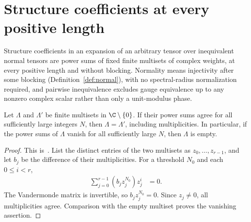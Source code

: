 \section{Structure coefficients at every positive length}
\label{sec:asym_unblocked_coefficients}

Structure coefficients in an expansion of an arbitrary tensor over
inequivalent normal tensors are power sums of fixed finite multisets of
complex weights, at every positive length and without blocking. Normality
means injectivity after some blocking (Definition~\ref{def:normal}), with no
spectral-radius normalization required, and pairwise inequivalence excludes
gauge equivalence up to any nonzero complex scalar rather than only a
unit-modulus phase.

\begin{lemma}
    \label{thm:asym_tail_weights}
    \leanok
    Let $\Lambda$ and $\Lambda'$ be finite multisets in $\C\setminus\{0\}$.
    If their power sums agree for all sufficiently large integers $N$, then
    $\Lambda=\Lambda'$, including multiplicities. In particular, if the
    power sums of $\Lambda$ vanish for all sufficiently large $N$, then
    $\Lambda$ is empty.
\end{lemma}
\begin{proof}
    \leanok
    This is~\cite[``Uniqueness of nonzero weights from tail power
        sums'']{QICLean2026Blueprint}.
    List the distinct entries of the two multisets as
    $z_0,\ldots,z_{r-1}$, and let $b_j$ be the difference of their
    multiplicities. For a threshold $N_0$ and each $0\leq i<r$,
    \begin{align}
        \sum_{j=0}^{r-1}(b_jz_j^{N_0})z_j^i & = 0.
    \end{align}
    The Vandermonde matrix is invertible, so $b_jz_j^{N_0}=0$.
    Since $z_j\neq0$, all multiplicities agree. Comparison with the empty
    multiset proves the vanishing assertion.
\end{proof}

